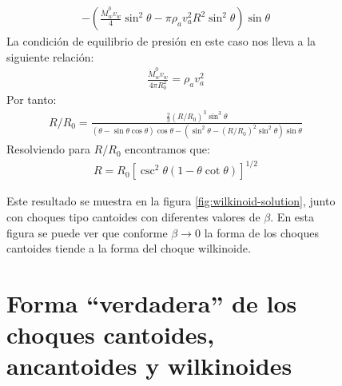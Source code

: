 \begin{figure}
\begin{align}
{  - \left(\frac{\dot{M}^0_w v_w}{4}\sin^2\theta - \pi\rho_a v^2_a R^2 \sin^2\theta\right)\sin\theta}
\end{align}
\normalsize
La condición de equilibrio de presión en este caso nos lleva a la siguiente relación:
\begin{align}
  \frac{\dot{M}^0_w v_w}{4\pi R^2_0} = \rho_a v^2_a \label{eq:Wilkin-stagnation}
\end{align}
Por tanto:
\begin{align}
  R/R_0 = \frac{\frac{2}{3}\left(R/R_0\right)^3 \sin^3\theta}{\left(\theta-\sin\theta\cos\theta\right)\cos\theta
  - \left(\sin^2\theta - \left(R/R_0\right)^2 \sin^2\theta\right)\sin\theta}
\end{align}
Resolviendo para $R/R_0$ encontramos que:
\begin{align}
  R = R_0\left[\csc^2\theta\left(1 - \theta\cot\theta\right)\right]^{1/2} \label{eq:R-Wilkin}
\end{align}

Este resultado se muestra en la figura \ref{fig:wilkinoid-solution}, junto con choques tipo cantoides con diferentes valores de $\beta$. En esta figura se puede ver que conforme $\beta\to 0$ la forma de los choques cantoides tiende a la forma del choque wilkinoide.

\section[Forma Verdadera]{Forma ``verdadera'' de los choques cantoides, ancantoides y wilkinoides}


\end{figure}
